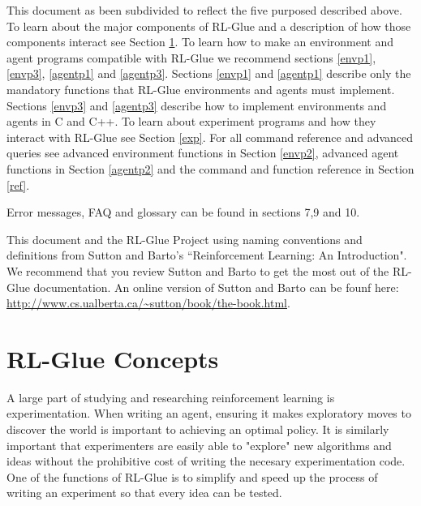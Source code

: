 \documentclass[11pt]{article}
\begin{document}
This document as been subdivided to reflect the five purposed described above. To learn about the major components of RL-Glue and a description of how those components interact see Section \ref{RL-Glue}. To learn how to make an environment and agent programs compatible with RL-Glue we recommend sections \ref{envp1}, \ref{envp3}, \ref{agentp1} and \ref{agentp3}. Sections \ref{envp1} and \ref{agentp1} describe only the mandatory functions that RL-Glue environments and agents must implement. Sections \ref{envp3} and \ref{agentp3} describe how to implement environments and agents in C and C++. To learn about experiment programs and how they interact with RL-Glue see Section \ref{exp}. For all command reference and advanced queries see advanced environment functions in Section \ref{envp2}, advanced agent functions in Section \ref{agentp2} and the command and function reference in Section \ref{ref}.

Error messages, FAQ and glossary can be found in sections 7,9 and 10.

This document and the RL-Glue Project using naming conventions and definitions from Sutton and Barto's ``Reinforcement Learning: An Introduction". We recommend that you review Sutton and Barto to get the most out of the RL-Glue documentation. An online version of Sutton and Barto can be founf here: \url{http://www.cs.ualberta.ca/~sutton/book/the-book.html}.



 
 
\section{RL-Glue Concepts}
\label{RL-Glue}
A large part of studying and researching reinforcement learning is experimentation. When writing an agent, ensuring it makes exploratory moves to discover the world is important to achieving an optimal policy. It is similarly important that experimenters are easily able to "explore" new algorithms and ideas without the prohibitive cost of writing the necesary experimentation code. One of the functions of RL-Glue is to simplify and speed up the process of writing an experiment so that every idea can be tested. 
\end{document}
